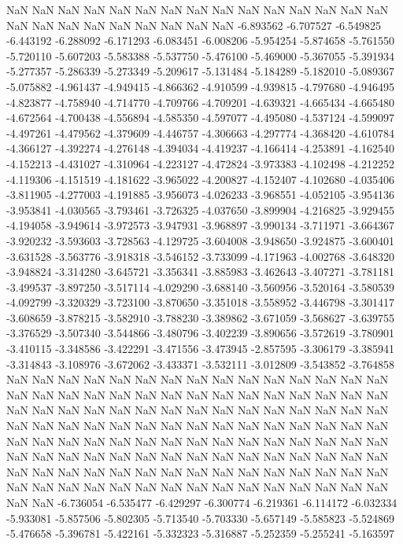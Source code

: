 NaN
NaN
NaN
NaN
NaN
NaN
NaN
NaN
NaN
NaN
NaN
NaN
NaN
NaN
NaN
NaN
NaN
NaN
NaN
NaN
NaN
NaN
NaN
NaN
-6.893562
-6.707527
-6.549825
-6.443192
-6.288092
-6.171293
-6.083451
-6.008206
-5.954254
-5.874658
-5.761550
-5.720110
-5.607203
-5.583388
-5.537750
-5.476100
-5.469000
-5.367055
-5.391934
-5.277357
-5.286339
-5.273349
-5.209617
-5.131484
-5.184289
-5.182010
-5.089367
-5.075882
-4.961437
-4.949415
-4.866362
-4.910599
-4.939815
-4.797680
-4.946495
-4.823877
-4.758940
-4.714770
-4.709766
-4.709201
-4.639321
-4.665434
-4.665480
-4.672564
-4.700438
-4.556894
-4.585350
-4.597077
-4.495080
-4.537124
-4.599097
-4.497261
-4.479562
-4.379609
-4.446757
-4.306663
-4.297774
-4.368420
-4.610784
-4.366127
-4.392274
-4.276148
-4.394034
-4.419237
-4.166414
-4.253891
-4.162540
-4.152213
-4.431027
-4.310964
-4.223127
-4.472824
-3.973383
-4.102498
-4.212252
-4.119306
-4.151519
-4.181622
-3.965022
-4.200827
-4.152407
-4.102680
-4.035406
-3.811905
-4.277003
-4.191885
-3.956073
-4.026233
-3.968551
-4.052105
-3.954136
-3.953841
-4.030565
-3.793461
-3.726325
-4.037650
-3.899904
-4.216825
-3.929455
-4.194058
-3.949614
-3.972573
-3.947931
-3.968897
-3.990134
-3.711971
-3.664367
-3.920232
-3.593603
-3.728563
-4.129725
-3.604008
-3.948650
-3.924875
-3.600401
-3.631528
-3.563776
-3.918318
-3.546152
-3.733099
-4.171963
-4.002768
-3.648320
-3.948824
-3.314280
-3.645721
-3.356341
-3.885983
-3.462643
-3.407271
-3.781181
-3.499537
-3.897250
-3.517114
-4.029290
-3.688140
-3.560956
-3.520164
-3.580539
-4.092799
-3.320329
-3.723100
-3.870650
-3.351018
-3.558952
-3.446798
-3.301417
-3.608659
-3.878215
-3.582910
-3.788230
-3.389862
-3.671059
-3.568627
-3.639755
-3.376529
-3.507340
-3.544866
-3.480796
-3.402239
-3.890656
-3.572619
-3.780901
-3.410115
-3.348586
-3.422291
-3.471556
-3.473945
-2.857595
-3.306179
-3.385941
-3.314843
-3.108976
-3.672062
-3.433371
-3.532111
-3.012809
-3.543852
-3.764858
NaN
NaN
NaN
NaN
NaN
NaN
NaN
NaN
NaN
NaN
NaN
NaN
NaN
NaN
NaN
NaN
NaN
NaN
NaN
NaN
NaN
NaN
NaN
NaN
NaN
NaN
NaN
NaN
NaN
NaN
NaN
NaN
NaN
NaN
NaN
NaN
NaN
NaN
NaN
NaN
NaN
NaN
NaN
NaN
NaN
NaN
NaN
NaN
NaN
NaN
NaN
NaN
NaN
NaN
NaN
NaN
NaN
NaN
NaN
NaN
NaN
NaN
NaN
NaN
NaN
NaN
NaN
NaN
NaN
NaN
NaN
NaN
NaN
NaN
NaN
NaN
NaN
NaN
NaN
NaN
NaN
NaN
NaN
NaN
NaN
NaN
NaN
NaN
NaN
NaN
NaN
NaN
NaN
NaN
NaN
NaN
NaN
NaN
NaN
NaN
NaN
NaN
NaN
NaN
NaN
NaN
NaN
NaN
NaN
NaN
NaN
NaN
NaN
NaN
NaN
NaN
NaN
NaN
NaN
NaN
NaN
NaN
-6.736054
-6.535477
-6.429297
-6.300774
-6.219361
-6.114172
-6.032334
-5.933081
-5.857506
-5.802305
-5.713540
-5.703330
-5.657149
-5.585823
-5.524869
-5.476658
-5.396781
-5.422161
-5.332323
-5.316887
-5.252359
-5.255241
-5.163597

